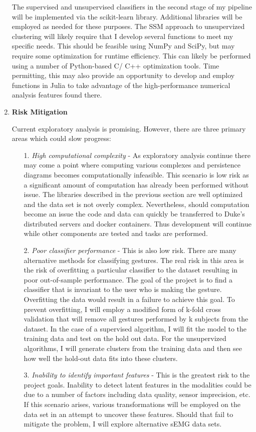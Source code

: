 \documentclass[11pt]{article}
\begin{document}
\begin{enumerate}
The supervised and unsupervised classifiers in the second stage of my pipeline will be implemented via the scikit-learn library. Additional libraries will be employed as needed for these purposes. The SSM approach to unsupervized clustering will likely require that I develop several functions to meet my specific needs. This should be feasible using NumPy and SciPy, but may require some optimization for runtime efficiency. This can likely be performed using a number of Python-based C/ C++ optimization tools. Time permitting, this may also provide an opportunity to develop and employ functions in Julia to take advantage of the high-performance numerical analysis features found there.

\item \textbf{Risk Mitigation}

Current exploratory analysis is promising. However, there are three primary areas which could slow progress:
\begin{enumerate}
\item[1.] \emph{High computational complexity} - As exploratory analysis continue there may come a point where computing various complexes and persistence diagrams becomes computationally infeasible. This scenario is low risk as a significant amount of computation has already been performed without issue. The libraries described in the previous section are well optimized and the data set is not overly complex. Nevertheless, should computation become an issue the code and data can quickly be transferred to Duke's distributed servers and docker containers. Thus development will continue while other components are tested and tasks are performed.
\item[2.] \emph{Poor classifier performance} - This is also low risk. There are many alternative methods for classifying gestures. The real risk in this area is the risk of overfitting a particular classifier to the dataset resulting in poor out-of-sample performance. The goal of the project is to find a classifier that is invariant to the user who is making the gesture. Overfitting the data would result in a failure to achieve this goal. To prevent overfitting, I will employ a modified form of k-fold cross validation that will remove all gestures performed by k subjects from the dataset. In the case of a supervised algorithm, I will fit the model to the training data and test on the hold out data. For the unsupervized algorithms, I will generate clusters from the training data and then see how well the hold-out data fits into these clusters.
\item[3.] \emph{Inability to identify important features} - This is the greatest risk to the project goals. Inability to detect latent features in the modalities could be due to a number of factors including data quality, sensor imprecision, etc. If this scenario arises, various transformations will be employed on the data set in an attempt to uncover these features. Should that fail to mitigate the problem, I will explore alternative sEMG data sets.
\end{enumerate}

\end{enumerate}
\end{document}
